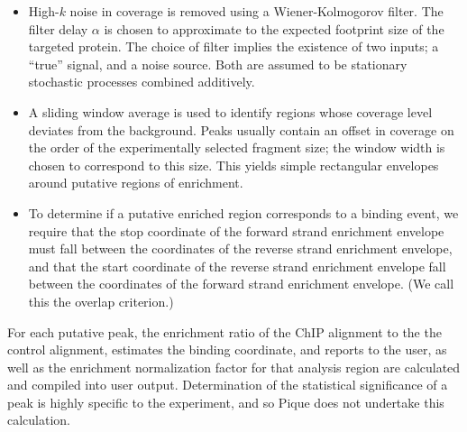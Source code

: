 \documentclass{bioinfo}
\begin{document}
\begin{methods}
\begin{itemize}
\item High-$k$ noise in coverage is removed using a Wiener-Kolmogorov
  filter. The filter delay $\alpha$ is chosen to approximate to the
  expected footprint size of the targeted protein. The choice of
  filter implies the existence of two inputs; a ``true'' signal, and a
  noise source. Both are assumed to be stationary stochastic processes
  combined additively.


\item A sliding window average is used to identify regions whose
  coverage level deviates from the background. Peaks usually contain
  an offset in coverage on the order of the experimentally selected
  fragment size; the window width is chosen to correspond to this
  size. This yields simple rectangular envelopes around putative
  regions of enrichment.

\item To determine if a putative enriched region corresponds to a
  binding event, we require that the stop coordinate of the forward
  strand enrichment envelope must fall between the coordinates of the
  reverse strand enrichment envelope, and that the start coordinate of
  the reverse strand enrichment envelope fall between the coordinates
  of the forward strand enrichment envelope. (We call this the overlap
  criterion.)

\end{itemize}


\noindent For each putative peak, the enrichment ratio of the ChIP
alignment to the the control alignment, estimates the binding
coordinate, and reports to the user, as well as the enrichment
normalization factor for that analysis region are calculated and
compiled into user output.  Determination of the statistical
significance of a peak is highly specific to the experiment, and so
Pique does not undertake this calculation.

\end{methods}
\end{document}
